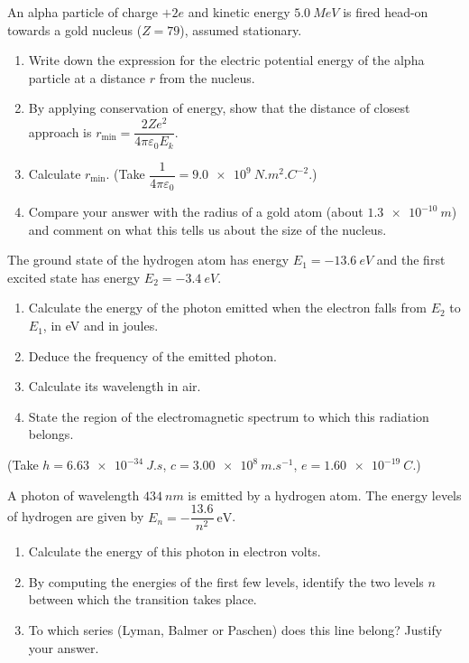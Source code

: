\documentclass[11pt]{article}
\begin{document}
\begin{exercice}
An alpha particle of charge $+2e$ and kinetic energy $\SI{5.0}{MeV}$ is fired head-on towards a gold nucleus ($Z = 79$), assumed stationary.
\begin{enumerate}
\item Write down the expression for the electric potential energy of the alpha particle at a distance $r$ from the nucleus.
\item By applying conservation of energy, show that the distance of closest approach is $r_{\min} = \dfrac{2Ze^{2}}{4\pi\varepsilon_{0}E_{k}}$.
\item Calculate $r_{\min}$. (Take $\dfrac{1}{4\pi\varepsilon_{0}} = \SI{9.0e9}{N.m^{2}.C^{-2}}$.)
\item Compare your answer with the radius of a gold atom (about $\SI{1.3e-10}{m}$) and comment on what this tells us about the size of the nucleus.
\end{enumerate}
\end{exercice}

\begin{exercice}
The ground state of the hydrogen atom has energy $E_1 = \SI{-13.6}{eV}$ and the first excited state has energy $E_2 = \SI{-3.4}{eV}$.
\begin{enumerate}
\item Calculate the energy of the photon emitted when the electron falls from $E_2$ to $E_1$, in eV and in joules.
\item Deduce the frequency of the emitted photon.
\item Calculate its wavelength in air.
\item State the region of the electromagnetic spectrum to which this radiation belongs.
\end{enumerate}
(Take $h = \SI{6.63e-34}{J.s}$, $c = \SI{3.00e8}{m.s^{-1}}$, $e = \SI{1.60e-19}{C}$.)
\end{exercice}

\begin{exercice}
A photon of wavelength $\SI{434}{nm}$ is emitted by a hydrogen atom. The energy levels of hydrogen are given by $E_n = -\dfrac{13.6}{n^{2}}\ \mathrm{eV}$.
\begin{enumerate}
\item Calculate the energy of this photon in electron volts.
\item By computing the energies of the first few levels, identify the two levels $n$ between which the transition takes place.
\item To which series (Lyman, Balmer or Paschen) does this line belong? Justify your answer.
\end{enumerate}
\end{exercice}
\end{document}
